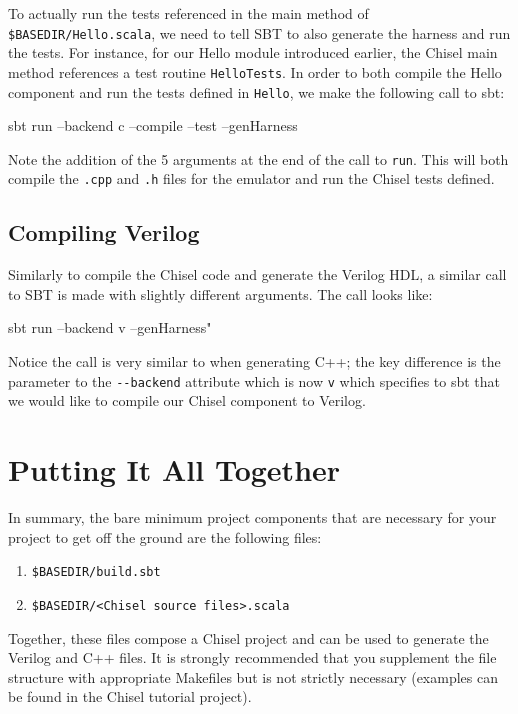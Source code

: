 To actually run the tests referenced in the main method of \verb+$BASEDIR/Hello.scala+, we need to tell SBT to also generate the harness and run the tests. For instance, for our Hello module introduced earlier, the Chisel main method references a test routine \verb+HelloTests+. In order to both compile the Hello component and run the tests defined in \verb+Hello+, we make the following call to sbt:

\begin{bash}
sbt run --backend c --compile --test --genHarness
\end{bash}

Note the addition of the 5 arguments at the end of the call to \verb+run+. This will both compile the \verb+.cpp+ and \verb+.h+ files for the emulator and run the Chisel tests defined. 

\subsection{Compiling Verilog}

Similarly to compile the Chisel code and generate the Verilog HDL, a similar call to SBT is made with slightly different arguments. The call looks like:

\begin{bash}
sbt run --backend v --genHarness"
\end{bash}

Notice the call is very similar to when generating C++; the key difference is the parameter to the \verb+--backend+ attribute which is now \verb+v+ which specifies to sbt that we would like to compile our Chisel component to Verilog. 

\section{Putting It All Together}

In summary, the bare minimum project components that are necessary for your project to get off the ground are the following files:

\begin{enumerate}
\item \verb+$BASEDIR/build.sbt+
\item \verb+$BASEDIR/<Chisel source files>.scala+
\end{enumerate}

Together, these files compose a Chisel project and can be used to generate the Verilog and C++ files. It is strongly recommended that you supplement the file structure with appropriate Makefiles but is not strictly necessary (examples can be found in the Chisel tutorial project).

